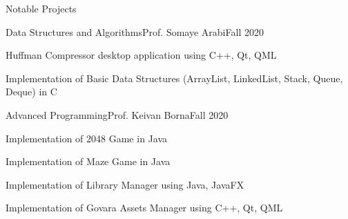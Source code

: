 \documentclass[]{main}
\begin{document}
\begin{section}{Notable Projects}
\begin{subsection}{Data Structures and Algorithms}{Prof. Somaye Arabi}{Fall 2020}{}
        \item Huffman Compressor desktop application using C++, Qt, QML \;\href{https://github.com/ckoliber/kuffman}{\faExternalLink*}
        \item Implementation of Basic Data Structures (ArrayList, LinkedList, Stack, Queue, Deque) in C \;\href{https://github.com/ckoliber/kstd}{\faExternalLink*}
        \end{subsection}
\begin{subsection}{Advanced Programming}{Prof. Keivan Borna}{Fall 2020}{}
        \item Implementation of 2048 Game in Java \;\href{https://github.com/ckoliber/2048}{\faExternalLink*}
        \item Implementation of Maze Game in Java \;\href{https://github.com/ckoliber/Maze}{\faExternalLink*}
        \item Implementation of Library Manager using Java, JavaFX \;\href{https://github.com/ckoliber/LibraryManager}{\faExternalLink*}
        \item Implementation of Govara Assets Manager using C++, Qt, QML \;\href{https://github.com/ckoliber/govara}{\faExternalLink*}
        \end{subsection}

\end{section}
\end{document}
